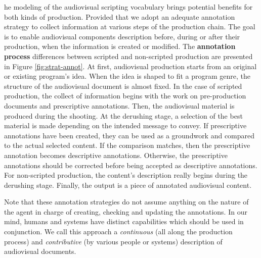 he modeling of the audiovisual scripting vocabulary brings potential benefits for both kinds of production. Provided that we adopt an adequate annotation strategy to collect information at various steps of the production chain. The goal is to enable audiovisual components description before, during or after their production, when the information is created or modified. The \textbf{annotation process} differences between scripted and non-scripted production are presented in Figure \ref{fig:strat-annot}.
At first, audiovisual production starts from an original or existing program's idea. When the idea is shaped to fit a program genre, the structure of the audiovisual document is almost fixed. In the case of scripted production, the collect of information begins with the work on pre-production documents and prescriptive annotations. Then, the audiovisual material is produced during the shooting. At the derushing stage, a selection of the best material is made depending on the intended message to convey. If prescriptive annotations have been created, they can be used as a groundwork and compared to the actual selected content. If the comparison matches, then the prescriptive annotation becomes descriptive annotations. Otherwise, the prescriptive annotations should be corrected before being accepted as descriptive annotations. For non-scripted production, the content's description really begins during the derushing stage. Finally, the output is a piece of annotated audiovisual content.

Note that these annotation strategies do not assume anything on the nature of the agent in charge of creating, checking and updating the annotations. In our mind, humans and systems have distinct capabilities which should be used in conjunction. We call this approach a \textit{continuous} (all along the production process) and \textit{contributive} (by various people or systems) description of audiovisual documents.
